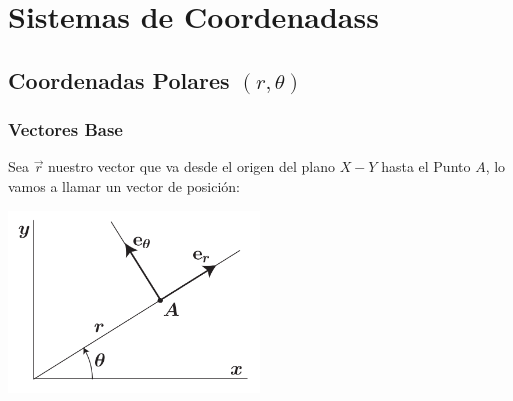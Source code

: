 \documentclass[12pt, fleqn]{report}                             %
\begin{document}
\restoregeometry                                                    %
\nopagecolor                                                        %






\tableofcontents{}
\label{sec:Index}

\clearpage




\part{Sistemas de Coordenadass}
\clearpage


    \chapter{Coordenadas Polares $(r, \theta)$}

        \clearpage
        \section{Vectores Base}

            Sea $\vec r$ nuestro vector que va desde el origen del plano $X-Y$ hasta el Punto $A$,
            lo vamos a llamar un vector de posición:

            \includegraphics[width=0.50\textwidth]{CoordenadasPolares.png}
\end{document}
